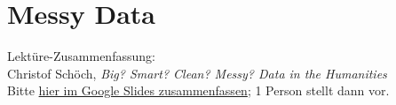 


\section{Messy Data}


\begin{frame}[standout]
    \alert{Lektüre}-Zusammenfassung: \\
    Christof Schöch, \emph{Big? Smart? Clean? Messy? Data in the Humanities} \\[1em]
    {\footnotesize Bitte \alert{\href{https://docs.google.com/presentation/d/1JweC-x1MxLjoKcDcHDtsw6NoYZfSbQ0USVYzYxqVx_c/edit?usp=sharing}{hier im Google Slides zusammenfassen}}; 1 Person stellt dann vor. \\
    }
\end{frame}


